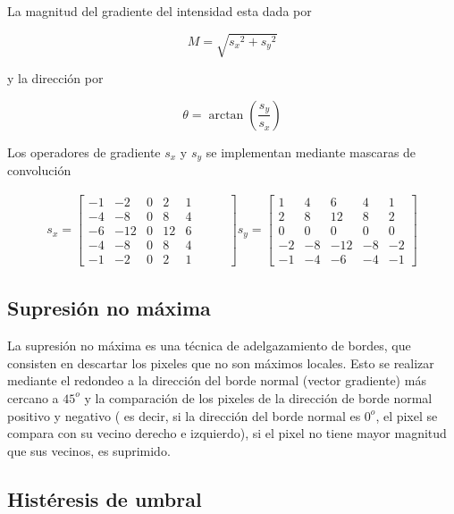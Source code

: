 La magnitud del gradiente del intensidad esta dada por 

\begin{equation}
M=\sqrt{{s_{x}}^{2}+{s_{y}}^{2}}
\end{equation}

y la dirección por

\begin{equation}
\theta = \arctan\left({\frac{s_{y}}{s_{x}}}\right)
\end{equation} 

Los operadores de gradiente $s_{x}$ y $s_{y}$ se implementan mediante mascaras de convolución 

\begin{equation}
\begin{array}{cclcccl}
s_{x} =\begin{bmatrix}
-1 & -2 & 0 & 2 & 1 \\ 
-4 & -8 & 0 & 8 & 4 \\ 
-6 & -12 & 0 & 12 & 6 \\ 
-4 & -8 & 0 & 8 & 4 \\ 
-1 & -2 & 0 & 2 & 1 &\hspace{1em}&
\end{bmatrix}
s_{y} =\begin{bmatrix}
1 & 4 & 6 & 4 & 1 \\ 
2 & 8 & 12 & 8 & 2 \\ 
0 & 0 & 0 & 0 & 0 \\ 
-2 & -8 & -12 & -8 & -2\\ 
-1 & -4 & -6 & -4 & -1
\end{bmatrix} 
\end{array}
\end{equation}

\subsection{Supresión no máxima}

La supresión no máxima es una técnica de adelgazamiento de bordes, que consisten en descartar los pixeles que no son máximos locales. Esto se realizar mediante el redondeo a la dirección del borde normal (vector gradiente) más cercano a $45^{o}$ y la comparación de los pixeles de la dirección de borde normal positivo y negativo ( es decir, si la dirección del borde normal es $0^{o}$, el pixel se compara con su vecino derecho e izquierdo), si el pixel no tiene mayor magnitud que sus vecinos, es suprimido.


\subsection{Histéresis de umbral}

